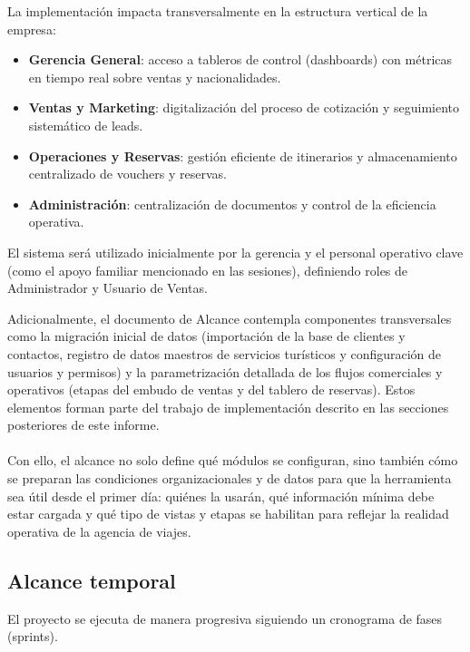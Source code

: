 \begin{indentedsubsection}
La implementación impacta transversalmente en la estructura vertical de la empresa:

\begin{itemize}
    \item[a.] \textbf{Gerencia General}: acceso a tableros de control (dashboards) con métricas en tiempo real sobre ventas y nacionalidades.
    \item[b.] \textbf{Ventas y Marketing}: digitalización del proceso de cotización y seguimiento sistemático de leads.
    \item[c.] \textbf{Operaciones y Reservas}: gestión eficiente de itinerarios y almacenamiento centralizado de vouchers y reservas.
    \item[d.] \textbf{Administración}: centralización de documentos y control de la eficiencia operativa.
\end{itemize}

El sistema será utilizado inicialmente por la gerencia y el personal operativo clave (como el apoyo familiar mencionado en las sesiones), definiendo roles de Administrador y Usuario de Ventas.

Adicionalmente, el documento de Alcance contempla componentes transversales como la migración inicial de datos (importación de la base de clientes y contactos, registro de datos maestros de servicios turísticos y configuración de usuarios y permisos) y la parametrización detallada de los flujos comerciales y operativos (etapas del embudo de ventas y del tablero de reservas). Estos elementos forman parte del trabajo de implementación descrito en las secciones posteriores de este informe.
\\
\\
Con ello, el alcance no solo define qué módulos se configuran, sino también cómo se preparan las condiciones organizacionales y de datos para que la herramienta sea útil desde el primer día: quiénes la usarán, qué información mínima debe estar cargada y qué tipo de vistas y etapas se habilitan para reflejar la realidad operativa de la agencia de viajes.

\end{indentedsubsection}

\subsection{Alcance temporal}

\begin{indentedsubsection}
El proyecto se ejecuta de manera progresiva siguiendo un cronograma de fases (sprints).

\end{indentedsubsection}

